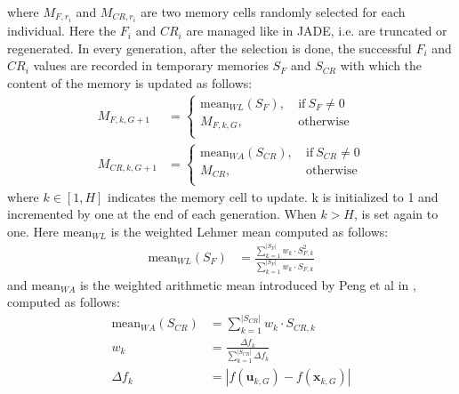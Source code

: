 where $M_{F, r_{i}}$ and $M_{\textit{CR}, r_{i}}$ are two memory cells randomly selected for each individual. Here the $F_{i}$ and $\textit{CR}_{i}$ are managed like in JADE, i.e. are truncated or regenerated.\newline\newline
In every generation, after the selection is done, the successful $F_{i}$ and $\textit{CR}_{i}$ values are recorded in temporary memories $S_{F}$ and $S_{\textit{CR}}$ with which the content of the memory is updated as follows:
\begin{align}
	M_{F,k,G+1} &= \begin{cases}
		\textrm{mean}_{\textit{WL}}(S_{F}),&\ \textrm{if}\ S_{F} \neq 0 \\
		M_{F,k,G},&\ \textrm{otherwise} \\
	\end{cases}\\
	M_{\textit{CR}, k, G + 1} &= \begin{cases}
		\textrm{mean}_{\textit{WA}}(S_{\textit{CR}}),&\ \textrm{if}\ S_{\textit{CR}} \neq 0 \\
		M_{\textit{CR}},&\ \textrm{otherwise} \\
	\end{cases}
\end{align}
where $k \in [1, H]$ indicates the memory cell to update. k is initialized to 1 and incremented by one at the end of each generation. When $k > H$, is set again to one. Here $\textrm{mean}_{\textit{WL}}$ is the weighted Lehmer mean computed as follows:
\begin{align}
	\textrm{mean}_{\textit{WL}}(S_{F}) &= \frac{\sum_{k=1}^{|S_{F}|}w_{k} \cdot S_{F,k}^2}{\sum_{k=1}^{|S_{F}|}w_{k} \cdot S_{F,k}}
\end{align}
and $\textrm{mean}_{\textit{WA}}$ is the weighted arithmetic mean introduced by Peng et al in \cite{MSJADE:2009}, computed as follows:
\begin{align}
	\textrm{mean}_{\textit{WA}}(S_{\textit{CR}}) &= \sum\limits_{k=1}^{|S_{\textit{CR}}|}w_{k}\cdot S_{\textit{CR},k} \\
	w_k &= \frac{\Delta f_{k}}{\sum_{k=1}^{|S_{\textit{CR}}|}\Delta f_{k}} \\
	\Delta f_{k} &= |f(\textbf{u}_{k,G}) - f(\textbf{x}_{k,G})|
\end{align}
